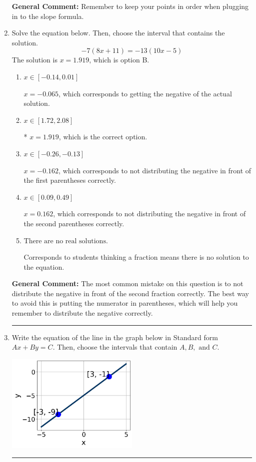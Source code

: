 \documentclass{extbook}[14pt]
\newcommand{\litem}[1]{\item #1

\rule{\textwidth}{0.4pt}}
\begin{document}
\begin{enumerate}
{\textbf{General Comment:} Remember to keep your points in order when plugging in to the slope formula.
}
\litem{
Solve the equation below. Then, choose the interval that contains the solution.
\[ -7(8x + 11) = -13(10x -5) \]
The solution is \( x = 1.919 \), which is option B.\begin{enumerate}[label=\Alph*.]
\item \( x \in [-0.14, 0.01] \)

$x = -0.065$, which corresponds to getting the negative of the actual solution.
\item \( x \in [1.72, 2.08] \)

* $x = 1.919$, which is the correct option.
\item \( x \in [-0.26, -0.13] \)

$x = -0.162$, which corresponds to not distributing the negative in front of the first parentheses correctly.
\item \( x \in [0.09, 0.49] \)

$x = 0.162$, which corresponds to not distributing the negative in front of the second parentheses correctly.
\item \( \text{There are no real solutions.} \)

Corresponds to students thinking a fraction means there is no solution to the equation.
\end{enumerate}

\textbf{General Comment:} The most common mistake on this question is to not distribute the negative in front of the second fraction correctly. The best way to avoid this is putting the numerator in parentheses, which will help you remember to distribute the negative correctly.
}
\litem{
Write the equation of the line in the graph below in Standard form $Ax+By=C$. Then, choose the intervals that contain $A, B, \text{ and } C$.

\begin{center}
    \includegraphics[width=0.5\textwidth]{../Figures/linearGraphToStandardCopyC.png}
\end{center}



}
\end{enumerate}
\end{document}
